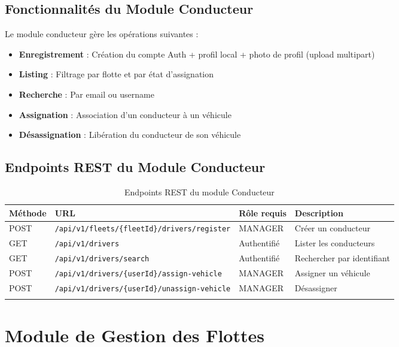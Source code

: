 \documentclass[12pt,a4paper]{report}
\begin{document}
\subsection{Fonctionnalités du Module Conducteur}

Le module conducteur gère les opérations suivantes :

\begin{itemize}[leftmargin=2cm]
  \item \textbf{Enregistrement} : Création du compte Auth + profil local + photo de profil (upload multipart)
  \item \textbf{Listing} : Filtrage par flotte et par état d'assignation
  \item \textbf{Recherche} : Par email ou username
  \item \textbf{Assignation} : Association d'un conducteur à un véhicule
  \item \textbf{Désassignation} : Libération du conducteur de son véhicule
\end{itemize}

\subsection{Endpoints REST du Module Conducteur}

\begin{longtable}{p{1.5cm}p{7cm}p{2.5cm}p{2cm}}
\toprule
\textbf{Méthode} & \textbf{URL} & \textbf{Rôle requis} & \textbf{Description} \\
\midrule
\endhead
POST & \texttt{/api/v1/fleets/\{fleetId\}/drivers/register} & MANAGER & Créer un conducteur \\
GET & \texttt{/api/v1/drivers} & Authentifié & Lister les conducteurs \\
GET & \texttt{/api/v1/drivers/search} & Authentifié & Rechercher par identifiant \\
POST & \texttt{/api/v1/drivers/\{userId\}/assign-vehicle} & MANAGER & Assigner un véhicule \\
POST & \texttt{/api/v1/drivers/\{userId\}/unassign-vehicle} & MANAGER & Désassigner \\
\bottomrule
\caption{Endpoints REST du module Conducteur}
\end{longtable}

\section{Module de Gestion des Flottes}
\end{document}
